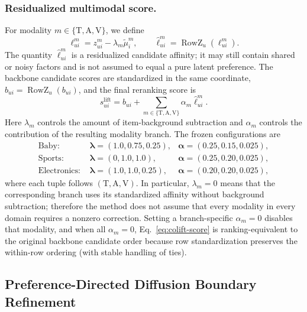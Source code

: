 \documentclass[sigconf,anonymous,review]{acmart}
\begin{document}
\subsubsection{Residualized multimodal score.}
For modality $m\in\{\mathrm{T},\mathrm{A},\mathrm{V}\}$, we define
\begin{equation}
    \ell_{ui}^{m}
    =
    z_{ui}^{m}
    -
    \lambda_m\widetilde{\mu}_i^m,
    \qquad
    \widehat{\ell}_{ui}^{m}
    =
    \operatorname{RowZ}_u(\ell_{ui}^{m}).
    \label{eq:lift}
\end{equation}
The quantity $\widehat{\ell}_{ui}^{m}$ is a residualized candidate affinity; it may still contain shared or noisy factors and is not assumed to equal a pure latent preference.
The backbone candidate scores are standardized in the same coordinate,
$\widehat b_{ui}=\operatorname{RowZ}_u(b_{ui})$,
and the final reranking score is
\begin{equation}
    s_{ui}^{\mathrm{lift}}
    =
    \widehat b_{ui}
    +
    \sum_{m\in\{\mathrm{T},\mathrm{A},\mathrm{V}\}}
    \alpha_m\widehat{\ell}_{ui}^{m}.
    \label{eq:colift-score}
\end{equation}
Here $\lambda_m$ controls the amount of item-background subtraction and $\alpha_m$ controls the contribution of the resulting modality branch.
The frozen configurations are
\begin{align*}
\text{Baby: }&\boldsymbol{\lambda}=(1.0,0.75,0.25),
&\boldsymbol{\alpha}=(0.25,0.15,0.025),\\
\text{Sports: }&\boldsymbol{\lambda}=(0,1.0,1.0),
&\boldsymbol{\alpha}=(0.25,0.20,0.025),\\
\text{Electronics: }&\boldsymbol{\lambda}=(1.0,1.0,0.25),
&\boldsymbol{\alpha}=(0.20,0.20,0.025),
\end{align*}
where each tuple follows $(\mathrm{T},\mathrm{A},\mathrm{V})$.
In particular, $\lambda_m=0$ means that the corresponding branch uses its standardized affinity without background subtraction; therefore the method does not assume that every modality in every domain requires a nonzero correction.
Setting a branch-specific $\alpha_m=0$ disables that modality, and when all $\alpha_m=0$, Eq.~\eqref{eq:colift-score} is ranking-equivalent to the original backbone candidate order because row standardization preserves the within-row ordering (with stable handling of ties).

\subsection{Preference-Directed Diffusion Boundary Refinement}
\label{sec:pdbr}
\end{document}
